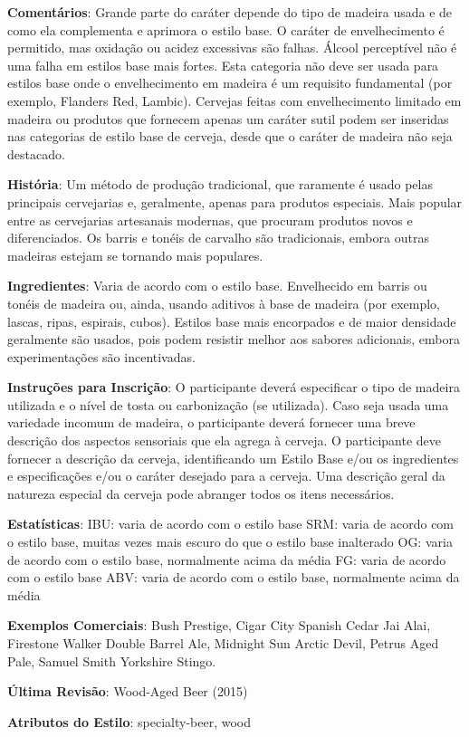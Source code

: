 \textbf{Comentários}: Grande parte do caráter depende do tipo de madeira usada e de como ela complementa e aprimora o estilo base. O caráter de envelhecimento é permitido, mas oxidação ou acidez excessivas são falhas. Álcool perceptível não é uma falha em estilos base mais fortes. Esta categoria não deve ser usada para estilos base onde o envelhecimento em madeira é um requisito fundamental (por exemplo, Flanders Red, Lambic). Cervejas feitas com envelhecimento limitado em madeira ou produtos que fornecem apenas um caráter sutil podem ser inseridas nas categorias de estilo base de cerveja, desde que o caráter de madeira não seja destacado.

\textbf{História}: Um método de produção tradicional, que raramente é usado pelas principais cervejarias e, geralmente, apenas para produtos especiais. Mais popular entre as cervejarias artesanais modernas, que procuram produtos novos e diferenciados. Os barris e tonéis de carvalho são tradicionais, embora outras madeiras estejam se tornando mais populares.

\textbf{Ingredientes}: Varia de acordo com o estilo base. Envelhecido em barris ou tonéis de madeira ou, ainda, usando aditivos à base de madeira (por exemplo, lascas, ripas, espirais, cubos). Estilos base mais encorpados e de maior densidade geralmente são usados, pois podem resistir melhor aos sabores adicionais, embora experimentações são incentivadas.

\textbf{Instruções para Inscrição}: O participante deverá especificar o tipo de madeira utilizada e o nível de tosta ou carbonização (se utilizada). Caso seja usada uma variedade incomum de madeira, o participante deverá fornecer uma breve descrição dos aspectos sensoriais que ela agrega à cerveja. O participante deve fornecer a descrição da cerveja, identificando um Estilo Base e/ou os ingredientes e especificações e/ou o caráter desejado para a cerveja. Uma descrição geral da natureza especial da cerveja pode abranger todos os itens necessários.

\textbf{Estatísticas}: IBU: varia de acordo com o estilo base
SRM: varia de acordo com o estilo base, muitas vezes mais escuro do que o estilo base inalterado
OG: varia de acordo com o estilo base, normalmente acima da média
FG: varia de acordo com o estilo base
ABV: varia de acordo com o estilo base, normalmente acima da média

\textbf{Exemplos Comerciais}: Bush Prestige, Cigar City Spanish Cedar Jai Alai, Firestone Walker Double Barrel Ale, Midnight Sun Arctic Devil, Petrus Aged Pale, Samuel Smith Yorkshire Stingo.

\textbf{Última Revisão}: Wood-Aged Beer (2015)

\textbf{Atributos do Estilo}: specialty-beer, wood
